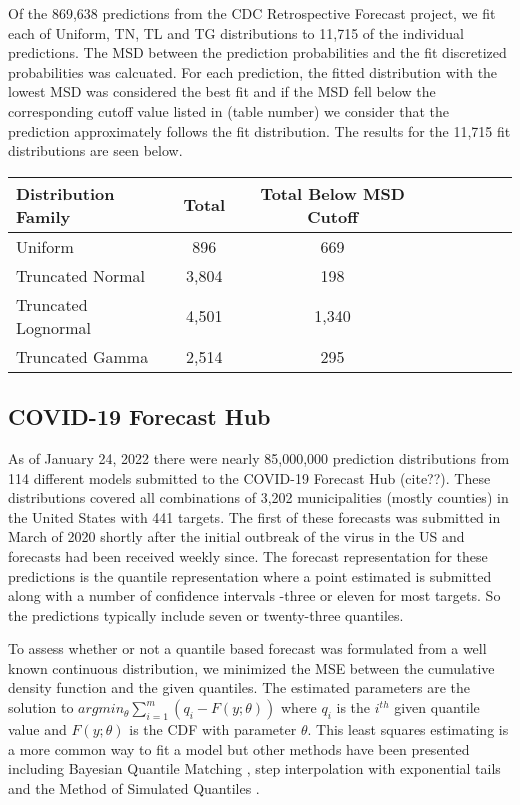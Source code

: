\documentclass{article}\usepackage[]{graphicx}\usepackage[]{color}
\begin{document}
Of the 869,638 predictions from the CDC Retrospective Forecast project, we fit
each of Uniform, TN, TL and TG distributions to 11,715 of the individual 
predictions. The MSD between the prediction probabilities and the fit
discretized probabilities was calcuated. For each prediction, the fitted 
distribution with the lowest MSD was considered the best fit and if the MSD fell
below the corresponding cutoff value listed in (table number) we consider that 
the prediction approximately follows the fit distribution. The results for the
11,715 fit distributions are seen below.

\begin{table}[h!]
  \centering
  \begin{tabular}{l*{6}{c}r}
  Distribution Family   & Total    & Total Below MSD Cutoff \\
  \hline
  Uniform               & 896      & 669    \\
  Truncated Normal      & 3,804    & 198    \\
  Truncated Lognormal   & 4,501    & 1,340  \\
  Truncated Gamma       & 2,514    & 295    \\
  \end{tabular}
\end{table}

\subsection{COVID-19 Forecast Hub}

As of January 24, 2022 there were nearly 85,000,000 prediction distributions 
from 114 different models submitted to the COVID-19 Forecast Hub (cite??). These 
distributions covered all combinations of 3,202 municipalities (mostly counties) 
in the United States with 441 targets. The first of these forecasts was 
submitted in March of 2020 shortly after the initial outbreak of the virus in 
the US and forecasts had been received weekly since. The forecast representation
for these predictions is the quantile representation where a point estimated is
submitted along with a number of confidence intervals -three or eleven for most
targets. So the predictions typically include seven or twenty-three quantiles.

To assess whether or not a quantile based forecast was formulated from a well
known continuous distribution, we minimized the MSE between the cumulative
density function and the given quantiles. The estimated parameters are the 
solution to $argmin_{\theta} \sum_{i=1}^m (q_i - F(y; \theta))$ where $q_i$ is
the $i^{th}$ given quantile value and $F(y; \theta)$ is the CDF with parameter
$\theta$. This least squares estimating is a more common way to fit a model but
other methods have been presented including Bayesian Quantile Matching
\cite{nirwan2020bayesian}, step interpolation with exponential tails 
\cite{quinonero2005evaluating}
and the Method of Simulated Quantiles 
\cite{dominicy2013method}.
\end{document}
